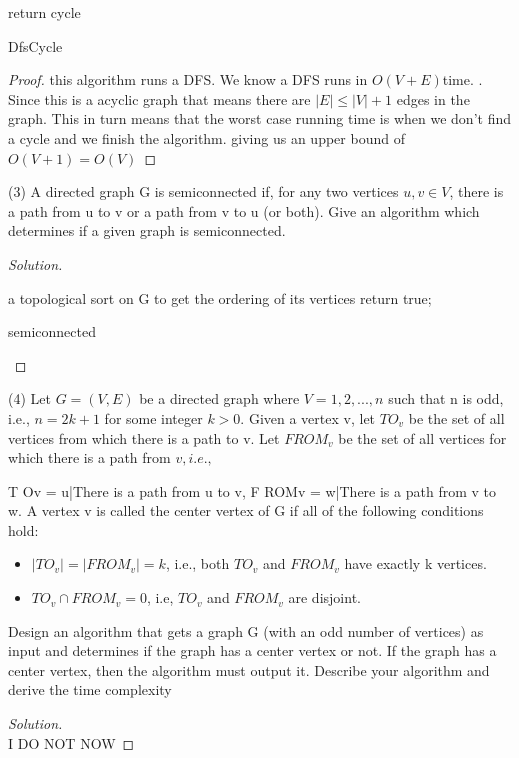 \documentclass[12pt]{article}
\begin{document}
\begin{algorithm}[H]
\SetAlgoLined
 return cycle\;
 \caption{DfsCycle}
\end{algorithm}
\begin{proof}
this algorithm runs a DFS. We know a DFS runs in $O(V + E)$time. . Since this is a acyclic graph that means there are $|E| \leq |V| + 1$ edges in the graph. This in turn means that the worst case running time is when we don't find a cycle and we finish the algorithm. giving us an upper bound of $O(V+1) = O(V)$   

\end{proof}

\break
(3) A directed graph G is semiconnected if, for any two vertices $u, v \in V $, there is a path from
u to v or a path from v to u (or both). Give an algorithm which determines if a given graph
is semiconnected.

\begin{proof}[Solution] $\;$\\
	\begin{algorithm}[H]
\SetAlgoLined
a topological sort on G
to get the ordering of its vertices\;
return true;
 \caption{semiconnected}
\end{algorithm}

\end{proof}

(4) Let $G = (V, E)$ be a directed graph where $V = {1, 2, . . . , n}$ such that n is odd, i.e.,
$n = 2k + 1$ for some integer $k > 0$. Given a vertex v, let $T O_v$ be the set of all vertices from
which there is a path to v. Let $FROM_v$ be the set of all vertices for which there is a path
from $v, i.e.,$

T Ov = {u|There is a path from u to v},
F ROMv = {w|There is a path from v to w}.
A vertex v is called the center vertex of G if all of the following conditions hold:
\begin{itemize}
\item
$|T O_v| = |F ROM_v| = k$, i.e., both $T O_v$ and $F ROM_v$ have exactly k vertices.
\item
$T O_v \cap F ROM_v = 0$, i.e, $T O_v$ and $F ROM_v$ are disjoint.
\end{itemize}

Design an algorithm that gets a graph G (with an odd number of vertices) as input and
determines if the graph has a center vertex or not. If the graph has a center vertex, then
the algorithm must output it. Describe your algorithm and derive the time complexity

\begin{proof}[Solution] $\;$\\

I DO NOT NOW

\end{proof}
\end{document}

